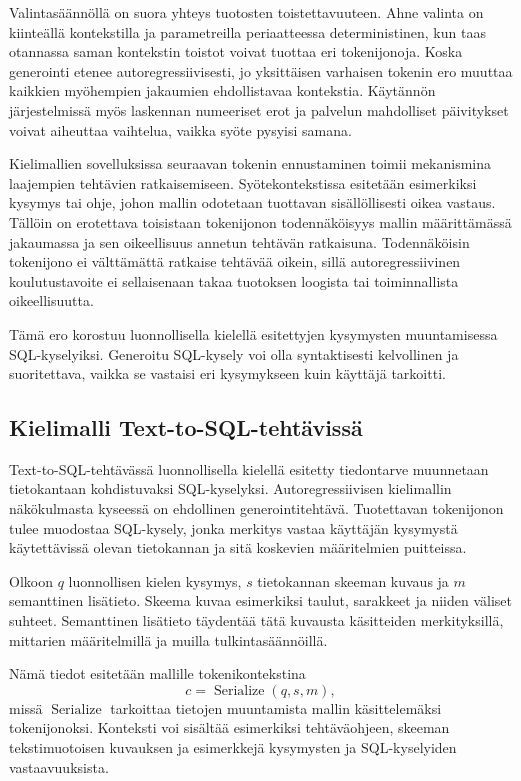 Valintasäännöllä on suora yhteys tuotosten toistettavuuteen.
Ahne valinta on kiinteällä kontekstilla ja parametreilla
periaatteessa deterministinen, kun taas otannassa saman kontekstin
toistot voivat tuottaa eri tokenijonoja. Koska generointi etenee
autoregressiivisesti, jo yksittäisen varhaisen tokenin ero muuttaa
kaikkien myöhempien jakaumien ehdollistavaa kontekstia. Käytännön
järjestelmissä myös laskennan numeeriset erot ja palvelun
mahdolliset päivitykset voivat aiheuttaa vaihtelua, vaikka
syöte pysyisi samana.

Kielimallien sovelluksissa seuraavan tokenin ennustaminen toimii mekanismina laajempien tehtävien ratkaisemiseen. Syötekontekstissa esitetään esimerkiksi kysymys tai ohje, johon mallin odotetaan tuottavan sisällöllisesti oikea vastaus. Tällöin on erotettava toisistaan tokenijonon todennäköisyys mallin määrittämässä jakaumassa ja sen oikeellisuus annetun tehtävän ratkaisuna. Todennäköisin tokenijono ei välttämättä ratkaise tehtävää oikein, sillä autoregressiivinen koulutustavoite ei sellaisenaan takaa tuotoksen loogista tai toiminnallista oikeellisuutta.

Tämä ero korostuu luonnollisella kielellä esitettyjen kysymysten muuntamisessa SQL-kyselyiksi. Generoitu SQL-kysely voi olla syntaktisesti kelvollinen ja suoritettava, vaikka se vastaisi eri kysymykseen kuin käyttäjä tarkoitti.

\subsection{Kielimalli Text-to-SQL-tehtävissä}

Text-to-SQL-tehtävässä luonnollisella kielellä esitetty
tiedontarve muunnetaan tietokantaan kohdistuvaksi
SQL-kyselyksi. Autoregressiivisen kielimallin näkökulmasta
kyseessä on ehdollinen generointitehtävä. Tuotettavan
tokenijonon tulee muodostaa SQL-kysely, jonka merkitys
vastaa käyttäjän kysymystä käytettävissä olevan tietokannan
ja sitä koskevien määritelmien puitteissa.

Olkoon \(q\) luonnollisen kielen kysymys,
\(s\) tietokannan skeeman kuvaus ja \(m\) semanttinen
lisätieto. Skeema kuvaa esimerkiksi taulut, sarakkeet
ja niiden väliset suhteet. Semanttinen lisätieto
täydentää tätä kuvausta käsitteiden merkityksillä,
mittarien määritelmillä ja muilla tulkintasäännöillä.

Nämä tiedot esitetään mallille tokenikontekstina
$$
c=\operatorname{Serialize}(q,s,m),
$$
missä \(\operatorname{Serialize}\) tarkoittaa tietojen
muuntamista mallin käsittelemäksi tokenijonoksi.
Konteksti voi sisältää esimerkiksi tehtäväohjeen,
skeeman tekstimuotoisen kuvauksen ja esimerkkejä
kysymysten ja SQL-kyselyiden vastaavuuksista.

